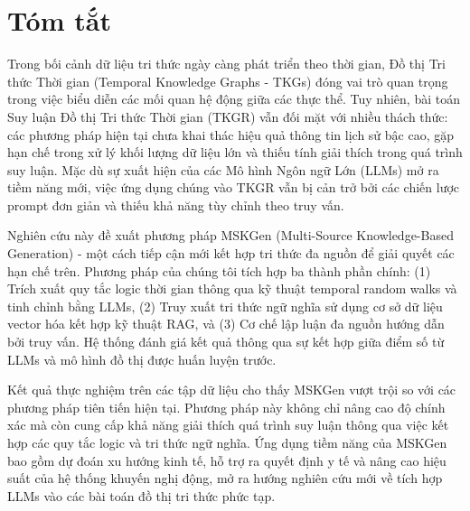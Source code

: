 \chapter*{Tóm tắt}
\label{summary}

Trong bối cảnh dữ liệu tri thức ngày càng phát triển theo thời gian, Đồ thị Tri thức Thời gian (Temporal Knowledge Graphs - TKGs) đóng vai trò quan trọng trong việc biểu diễn các mối quan hệ động giữa các thực thể. Tuy nhiên, bài toán Suy luận Đồ thị Tri thức Thời gian (TKGR) vẫn đối mặt với nhiều thách thức: các phương pháp hiện tại chưa khai thác hiệu quả thông tin lịch sử bậc cao, gặp hạn chế trong xử lý khối lượng dữ liệu lớn và thiếu tính giải thích trong quá trình suy luận. Mặc dù sự xuất hiện của các Mô hình Ngôn ngữ Lớn (LLMs) mở ra tiềm năng mới, việc ứng dụng chúng vào TKGR vẫn bị cản trở bởi các chiến lược prompt đơn giản và thiếu khả năng tùy chỉnh theo truy vấn.

Nghiên cứu này đề xuất phương pháp MSKGen (Multi-Source Knowledge-Based Generation) - một cách tiếp cận mới kết hợp tri thức đa nguồn để giải quyết các hạn chế trên. Phương pháp của chúng tôi tích hợp ba thành phần chính: (1) Trích xuất quy tắc logic thời gian thông qua kỹ thuật temporal random walks và tinh chỉnh bằng LLMs, (2) Truy xuất tri thức ngữ nghĩa sử dụng cơ sở dữ liệu vector hóa kết hợp kỹ thuật RAG, và (3) Cơ chế lập luận đa nguồn hướng dẫn bởi truy vấn. Hệ thống đánh giá kết quả thông qua sự kết hợp giữa điểm số từ LLMs và mô hình đồ thị được huấn luyện trước.

Kết quả thực nghiệm trên các tập dữ liệu cho thấy MSKGen vượt trội so với các phương pháp tiên tiến hiện tại. Phương pháp này không chỉ nâng cao độ chính xác mà còn cung cấp khả năng giải thích quá trình suy luận thông qua việc kết hợp các quy tắc logic và tri thức ngữ nghĩa. Ứng dụng tiềm năng của MSKGen bao gồm dự đoán xu hướng kinh tế, hỗ trợ ra quyết định y tế và nâng cao hiệu suất của hệ thống khuyến nghị động, mở ra hướng nghiên cứu mới về tích hợp LLMs vào các bài toán đồ thị tri thức phức tạp.
